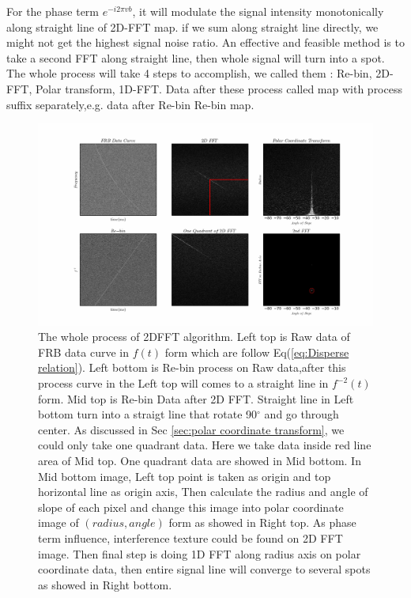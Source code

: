 \documentclass[twocolumn]{aastex61}
\begin{document}
For the phase term $e^{-i2\pi vb}$, it will modulate the signal intensity monotonically along straight line of 2D-FFT map. if we sum along straight line directly, we might not get the highest signal noise ratio. An effective and feasible method is to take a second FFT along straight line, then whole signal will turn into a spot. The whole process will take 4 steps to accomplish, we called them : Re-bin, 2D-FFT, Polar transform, 1D-FFT. Data after these process called map with process suffix separately,e.g. data after Re-bin  Re-bin map.


\begin{figure}

\centering
\includegraphics[width=180mm]{./pictures/procedure1.png}
\caption{The whole process of 2DFFT algorithm. Left top is Raw data of FRB data curve in $f(t)$ form which are follow Eq(\ref{eq:Disperse relation}). Left bottom is Re-bin process on Raw data,after this process curve in the Left top will comes to a straight line in $f^{-2}(t)$ form. Mid top is Re-bin Data after 2D FFT. Straight line in Left bottom turn into a straigt line that rotate 90$^{\circ}$ and go through center. As discussed in Sec \ref{sec:polar coordinate transform}, we could only take one quadrant data. Here we take data inside red line area of Mid top. One quadrant data are showed in Mid bottom. In Mid bottom image, Left top point is taken as origin and top horizontal line as origin axis, Then calculate the radius and angle of slope of each pixel and change this image into polar coordinate image of $(radius,angle)$ form as showed in Right top. As phase term influence, interference 	texture could be found on 2D FFT image. Then final step is doing 1D FFT along radius axis on polar coordinate data, then entire signal line will converge to several spots as showed in Right bottom.  \label{fig:Procedure}}
\end{figure}
\end{document}
